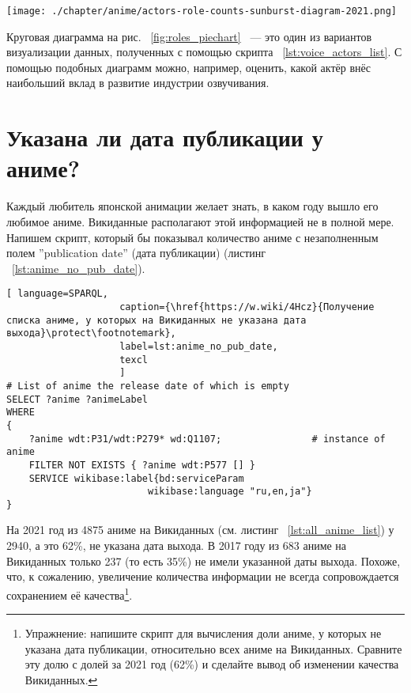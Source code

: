 \begin{figure*}[h]
	\texttt{[image: ./chapter/anime/actors-role-counts-sunburst-diagram-2021.png]}
	\caption[Круговая диаграмма числа ролей, озвученных различными сэйю, 2021.]{Диаграмма <<солнечные лучи>> числа ролей, озвученных различными актёрами, построенная с помощью сервиса Rawgraphs (\href{https://app.rawgraphs.io}{https://app.rawgraphs.io}).}%
      \label{fig:roles_piechart}%
\end{figure*}

Круговая диаграмма на рис. ~\protect\ref{fig:roles_piechart} ~--- это один из вариантов визуализации данных, полученных с помощью скрипта ~\protect\ref{lst:voice_actors_list}. С помощью подобных диаграмм можно, например, оценить, какой актёр внёс наибольший вклад в развитие индустрии озвучивания.

\section{Указана ли дата публикации у аниме?}

Каждый любитель японской анимации желает знать, в каком году вышло его любимое аниме. Викиданные располагают этой информацией не в полной мере. Напишем скрипт, который бы показывал количество аниме с незаполненным полем ''publication date'' (дата публикации) (листинг ~\protect\ref{lst:anime_no_pub_date}). 

\begin{lstlisting}[ language=SPARQL, 
                    caption={\href{https://w.wiki/4Hcz}{Получение списка аниме, у которых на Викиданных не указана дата выхода}\protect\footnotemark},
                    label=lst:anime_no_pub_date,
                    texcl 
                    ]
# List of anime the release date of which is empty
SELECT ?anime ?animeLabel
WHERE
{
    ?anime wdt:P31/wdt:P279* wd:Q1107;                # instance of anime
    FILTER NOT EXISTS { ?anime wdt:P577 [] }
    SERVICE wikibase:label{bd:serviceParam
					     wikibase:language "ru,en,ja"}
}
\end{lstlisting}%

На 2021 год из \num{4875} аниме на Викиданных (см. листинг ~\protect\ref{lst:all_anime_list}) у \num{2940}, а это \num{62}\%, не указана дата выхода. В 2017 году из \num{683} аниме на Викиданных только \num{237} (то есть \num{35}\%) не имели указанной даты выхода. Похоже, что, к сожалению, увеличение количества информации не всегда сопровождается сохранением её качества\footnote{Упражнение: напишите скрипт для вычисления доли аниме, у которых не указана дата публикации, относительно всех аниме на Викиданных. Сравните эту долю с долей за 2021 год (\num{62}\%) и сделайте вывод об изменении качества Викиданных.}.

